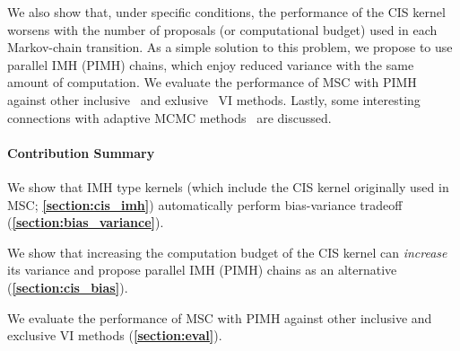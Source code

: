 We also show that, under specific conditions, the performance of the CIS kernel worsens with the number of proposals (or computational budget) used in each Markov-chain transition.
As a simple solution to this problem, we propose to use parallel IMH (PIMH) chains, which enjoy reduced variance with the same amount of computation.
We evaluate the performance of MSC with PIMH against other inclusive~\cite{DBLP:journals/corr/BornscheinB14, NEURIPS2020_b2070693} and exlusive~\cite{pmlr-v33-ranganath14, JMLR:v18:16-107} VI methods.
Lastly, some interesting connections with adaptive MCMC methods~\citep{10.1007/s11222-008-9110-y} are discussed.

\paragraph{Contribution Summary}
\begin{enumerate*}[label=\textbf{(\roman*)}]
\item We show that IMH type kernels (which include the CIS kernel originally used in MSC; \textbf{\cref{section:cis_imh}}) automatically perform bias-variance tradeoff (\textbf{\cref{section:bias_variance}}).
\item We show that increasing the computation budget of the CIS kernel can \textit{increase} its variance and propose parallel IMH (PIMH) chains as an alternative (\textbf{\cref{section:cis_bias}}).
\item We evaluate the performance of MSC with PIMH against other inclusive and exclusive VI methods (\textbf{\cref{section:eval}}).
\end{enumerate*}




